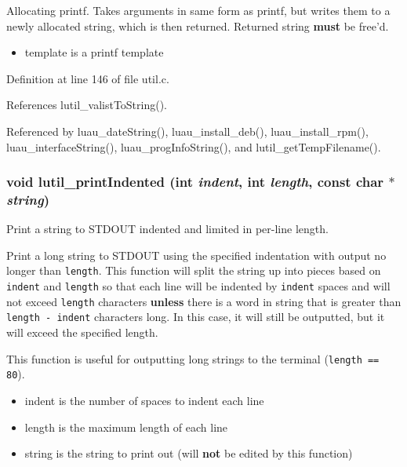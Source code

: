 Allocating printf. Takes arguments in same form as printf, but writes them to a newly allocated string, which is then returned. Returned string {\bf must} be free'd.

\begin{itemize}
\item template is a printf template 
\end{itemize}


Definition at line 146 of file util.c.

References lutil\_\-valist\-To\-String().

Referenced by luau\_\-date\-String(), luau\_\-install\_\-deb(), luau\_\-install\_\-rpm(), luau\_\-interface\-String(), luau\_\-prog\-Info\-String(), and lutil\_\-get\-Temp\-Filename().
\subsubsection{\setlength{\rightskip}{0pt plus 5cm}void lutil\_\-print\-Indented (int {\em indent}, int {\em length}, const char $\ast$ {\em string})}\label{util_8h_a19}


Print a string to STDOUT indented and limited in per-line length. 

Print a long string to STDOUT using the specified indentation with output no longer than {\tt length}. This function will split the string up into pieces based on {\tt indent} and {\tt length} so that each line will be indented by {\tt indent} spaces and will not exceed {\tt length} characters {\bf unless} there is a word in string that is greater than {\tt length - indent} characters long. In this case, it will still be outputted, but it will exceed the specified length.

This function is useful for outputting long strings to the terminal ({\tt length == 80}).

\begin{itemize}
\item indent is the number of spaces to indent each line \item length is the maximum length of each line \item string is the string to print out (will {\bf not} be edited by this function) \end{itemize}


